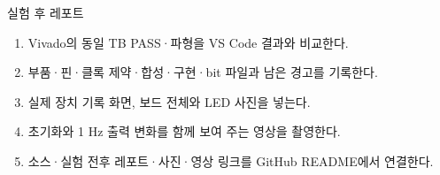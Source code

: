 \begin{frame}[label=after-report]{실험 후 레포트}
\small
\begin{enumerate}
\item Vivado의 동일 TB PASS·파형을 VS Code 결과와 비교한다.
\item 부품·핀·클록 제약·합성·구현·bit 파일과 남은 경고를 기록한다.
\item 실제 장치 기록 화면, 보드 전체와 LED 사진을 넣는다.
\item 초기화와 1 Hz 출력 변화를 함께 보여 주는 영상을 촬영한다.
\item 소스·실험 전후 레포트·사진·영상 링크를 GitHub README에서 연결한다.
\end{enumerate}
\end{frame}

